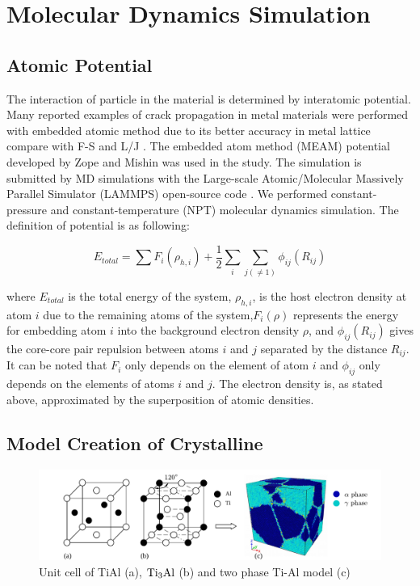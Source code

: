 \documentclass[metals,article,submit,moreauthors,pdftex,10pt,a4paper]{Definitions/mdpi}
\begin{document}
\section{Molecular Dynamics Simulation }\label{section:method}
\subsection{Atomic Potential}

The interaction of particle in the material is determined by interatomic potential. Many reported examples of crack propagation in metal materials were performed with embedded atomic method due to its better accuracy in metal lattice compare with F-S and L/J \cite{Ko2015}. The embedded atom method (MEAM) potential developed by Zope and Mishin \cite{Zope2003} was used in the study. The simulation is submitted by MD simulations with the Large-scale Atomic/Molecular Massively Parallel Simulator (LAMMPS) open-source code \cite{Plimpton1995}. We performed constant-pressure and constant-temperature (NPT) molecular dynamics simulation. The definition of potential is as following:
	
\begin{equation} \label{eq:eam} 
E_{total}= \displaystyle\sum F_i(\rho_{h,i})+\frac{1}{2}\sum_i\sum_{j(\neq1)}\phi_{ij}(R_{ij})
\end{equation}
	
where $E_{total}$ is the total energy of the system, $\rho_{h,i}$, is the host electron density at atom $i$ due to the remaining atoms of the system,$F_i(\rho)$ represents the energy for embedding atom $i$ into the background electron density $\rho$, and $\phi_{ij}(R_{ij})$ gives the core-core pair repulsion between atoms $i$ and $j$ separated by the distance $R_{ij}$. It can be noted that $F_i$ only depends on the element of atom $i$ and $\phi_{ij}$ only depends on the elements of atoms $i$ and $j$. The electron density is, as stated above, approximated by the superposition of atomic densities.
	
%	
\subsection{Model Creation of Crystalline}
\begin{figure}[ht]
	\centering
	\includegraphics[width=1\linewidth]{img/modeling}
	\caption{Unit cell of \rm{TiAl} (a), $\rm{Ti_3Al}$ (b) and two phase Ti-Al model (c)}
	\label{fig:tial-cell}
\end{figure}
\end{document}
